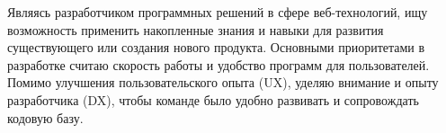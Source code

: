 

\begin{cvparagraph}

Являясь разработчиком программных решений в сфере веб-технологий, ищу возможность применить накопленные знания и навыки для развития существующего или создания нового продукта.
Основными приоритетами в разработке считаю скорость работы и удобство программ для пользователей.
Помимо улучшения пользовательского опыта (UX), уделяю внимание и опыту разработчика (DX), чтобы команде было удобно развивать и сопровождать кодовую базу.
\end{cvparagraph}
